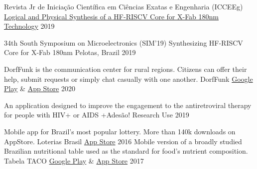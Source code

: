 
\begin{cventries}


    \cvcompactentry
    { Revista Jr de Iniciação Científica em Ciências Exatas e Engenharia (ICCEEg)}
    {\href{http://download.c3.furg.br/components/download_categoria/baixar.php?arquivo=e4873aa9a05cc5ed839561d121516766}{Logical and Physical Synthesis of a HF-RISCV Core for X-Fab 180nm Technology}}
    {}
    {2019}

  \cvcompactentry
    {34th South Symposium on Microelectronics (SIM'19)}
    {Synthesizing HF-RISCV Core for X-Fab 180nm}
    {Pelotas, Brazil}
    {2019}
\end{cventries}


\begin{cventries}

  \cvcompactentry
    {DorfFunk is the communication center for rural regions. Citizens can offer their help, submit requests or simply chat casually with one another.}
    {DorfFunk}
    {\href{https://play.google.com/store/apps/details?id=de.fhg.iese.dd.dorffunk.android&hl=pt_BR&gl=US}{Google Play} \& \href{https://apps.apple.com/app/id1348748008}{App Store} }
    {2020}

    \cvcompactentry
    {An application designed to improve the engagement to the antiretroviral therapy for people with HIV+ or AIDS}
    {+Adesão!}
    {Research Use}
    {2019}

  \cvcompactentry
    {Mobile app for Brazil’s most popular lottery. More than 140k downloads on AppStore.}
    {Loterias Brasil}
    {\href{https://apps.apple.com/app/id992505562}{App Store}}
    {2016}
  \cvcompactentry
    {Mobile version of a broadly studied Brazilian nutritional table used as the standard for food’s nutrient composition.}
    {Tabela TACO}
    {\href{https://play.google.com/store/apps/details?id=rodrigo.TabelaTaco&hl=pt_BR&gl=US}{Google Play} \& \href{https://apps.apple.com/app/id1066079092}{App Store} }
    {2017}

\end{cventries}

